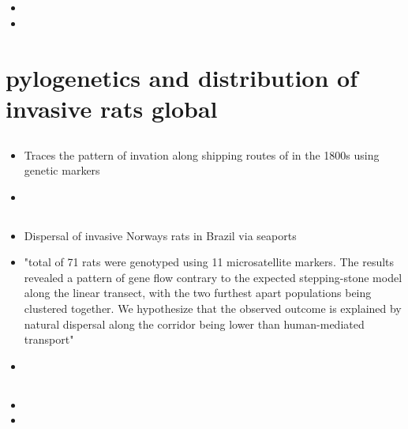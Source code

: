 \documentclass[document.tex]{subfiles}
\begin{document}
    \subsection{\citetitle{}}
    \begin{itemize}
    \item 
    \item 
    \end{itemize}


\section{pylogenetics and distribution of invasive rats global}

    \subsection{}
    \begin{itemize}
    \item Traces the pattern of invation along shipping routes of in the 1800s using genetic markers
    \item 
    \end{itemize}

    \subsection{}
    \begin{itemize}
    \item Dispersal of invasive Norways rats in Brazil via seaports
    \item  "total of 71 rats were genotyped using 11 microsatellite markers. The results revealed a pattern of gene flow contrary to the expected stepping-stone model along the linear transect, with the two furthest apart populations being clustered together. We hypothesize that the observed outcome is explained by natural dispersal along the corridor being lower than human-mediated transport"
    \item 
    \end{itemize}

    \subsection{\citetitle{}}
    \begin{itemize}
    \item 
    \item 
    \end{itemize}
\end{document}
